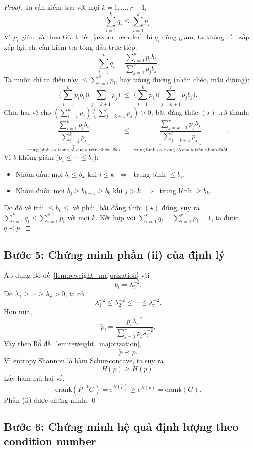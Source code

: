 \documentclass[11pt,a4paper]{article}
\newcommand{\erank}{\mathrm{erank}}
\begin{document}
\begin{proof}
Ta cần kiểm tra: với mọi $k = 1, \ldots, r-1$,
\[
\sum_{i=1}^k q_i \leq \sum_{i=1}^k p_i.
\]
Vì $p_i$ giảm và theo Giả thiết~\ref{ass:no_reorder} thì $q_i$ cũng giảm, ta không cần sắp xếp lại; chỉ cần kiểm tra tổng đầu trực tiếp:
\[
\sum_{i=1}^k q_i = \frac{\sum_{i=1}^k p_i b_i}{\sum_{j=1}^r p_j b_j}.
\]
Ta muốn chỉ ra điều này $\leq \sum_{i=1}^k p_i$, hay tương đương (nhân chéo, mẫu dương):
\[
\biggl(\sum_{i=1}^k p_i b_i\biggr)\biggl(\sum_{j=k+1}^r p_j\biggr)
\;\leq\;
\biggl(\sum_{i=1}^k p_i\biggr)\biggl(\sum_{j=k+1}^r p_j b_j\biggr).
\tag{$\star$}
\]
Chia hai vế cho $(\sum_{i=1}^k p_i)(\sum_{j=k+1}^r p_j) > 0$, bất đẳng thức $(\star)$ trở thành:
\[
\underbrace{\frac{\sum_{i=1}^k p_i b_i}{\sum_{i=1}^k p_i}}_{\text{trung bình có trọng số của } b \text{ trên nhóm đầu}}
\;\leq\;
\underbrace{\frac{\sum_{j=k+1}^r p_j b_j}{\sum_{j=k+1}^r p_j}}_{\text{trung bình có trọng số của } b \text{ trên nhóm đuôi}}.
\]
Vì $b$ không giảm ($b_1 \leq \cdots \leq b_r$):
\begin{itemize}[nosep]
    \item Nhóm đầu: mọi $b_i \leq b_k$ khi $i \leq k$ $\;\Longrightarrow\;$ trung bình $\leq b_k$.
    \item Nhóm đuôi: mọi $b_j \geq b_{k+1} \geq b_k$ khi $j > k$ $\;\Longrightarrow\;$ trung bình $\geq b_k$.
\end{itemize}
Do đó vế trái $\leq b_k \leq$ vế phải, bất đẳng thức $(\star)$ đúng, suy ra $\sum_{i=1}^k q_i \leq \sum_{i=1}^k p_i$ với mọi $k$. Kết hợp với $\sum_{i=1}^r q_i = \sum_{i=1}^r p_i = 1$, ta được $q \prec p$.
\end{proof}

\subsection{Bước 5: Chứng minh phần (ii) của định lý}

Áp dụng Bổ đề~\ref{lem:reweight_majorization} với
\[
b_i = \lambda_i^{-2}.
\]
Do $\lambda_1 \ge \cdots \ge \lambda_r > 0$, ta có
\[
\lambda_1^{-2} \le \lambda_2^{-2} \le \cdots \le \lambda_r^{-2}.
\]
Hơn nữa,
\[
\tilde p_i = \frac{p_i \lambda_i^{-2}}{\sum_{j=1}^r p_j \lambda_j^{-2}}.
\]
Vậy theo Bổ đề~\ref{lem:reweight_majorization},
\[
\tilde p \prec p.
\]
Vì entropy Shannon là hàm Schur-concave, ta suy ra
\[
H(\tilde p) \ge H(p).
\]
Lấy hàm mũ hai vế,
\[
\erank(P^{-1}G) = e^{H(\tilde p)} \ge e^{H(p)} = \erank(G).
\]
Phần (ii) được chứng minh. \qed

\subsection{Bước 6: Chứng minh hệ quả định lượng theo condition number}
\end{document}
